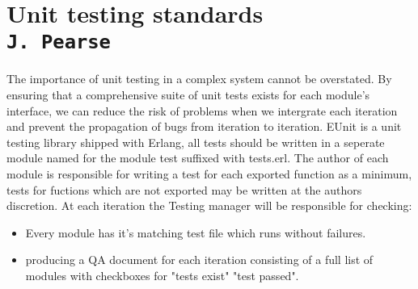 \pagestyle{empty}

\section{Unit testing standards\\{\small\tt{J.~Pearse}}}
The importance of unit testing in a complex system cannot be overstated. By ensuring that a comprehensive suite of unit tests exists for each module's interface, we can reduce the risk of problems when we intergrate each iteration and prevent the propagation of bugs from iteration to iteration.
EUnit is a unit testing library shipped with Erlang, all tests should be written in a seperate module named for the module test suffixed with tests.erl.
The author of each module is responsible for writing a test for each exported function as a minimum, tests for fuctions which are not exported may be written at the authors discretion.
At each iteration the Testing manager will be responsible for checking:
\begin{itemize}
\item
Every module has it's matching test file which runs without failures. \item
producing a QA document for each iteration consisting of a full list of modules with checkboxes for "tests exist" "test passed".
\end{itemize}

\clearpage
\endinput
